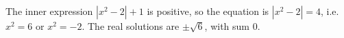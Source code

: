 The inner expression $\left|x^2-2\right|+1$ is positive, so the equation is $\left|x^2-2\right|=4$, i.e. $x^2=6$ or $x^2=-2$. The real solutions are $\pm\sqrt6$, with sum $\boxed{0}$.
